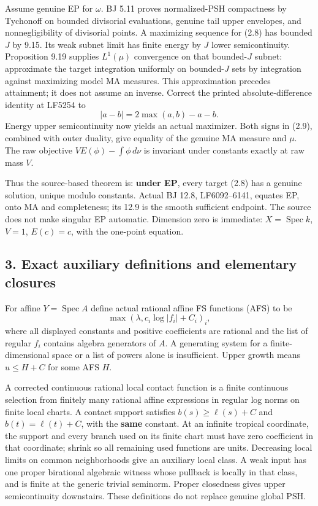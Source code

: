\documentclass[
  10pt,
]{article}
\begin{document}
Assume genuine EP for \(\omega\). BJ 5.11 proves normalized-PSH
compactness by Tychonoff on bounded divisorial evaluations, genuine tail
upper envelopes, and nonnegligibility of divisorial points. A maximizing
sequence for (2.8) has bounded \(J\) by 9.15. Its weak subnet limit has
finite energy by \(J\) lower semicontinuity. Proposition 9.19 supplies
\(L^1(\mu)\) convergence on that bounded-\(J\) subnet: approximate the
target integration uniformly on bounded-\(J\) sets by integration
against maximizing model MA measures. This approximation precedes
attainment; it does not assume an inverse. Correct the printed
absolute-difference identity at LF5254 to \[|a-b|=2\max(a,b)-a-b.\]
Energy upper semicontinuity now yields an actual maximizer. Both signs
in (2.9), combined with outer duality, give equality of the genuine MA
measure and \(\mu\). The raw objective \(VE(\phi)-\int\phi\,d\nu\) is
invariant under constants exactly at raw mass \(V\).

Thus the source-based theorem is: \textbf{under EP}, every target (2.8)
has a genuine solution, unique modulo constants. Actual BJ 12.8,
LF6092--6141, equates EP, onto MA and completeness; its 12.9 is the
smooth sufficient endpoint. The source does not make singular EP
automatic. Dimension zero is immediate: \(X=\operatorname{Spec}k\),
\(V=1\), \(E(c)=c\), with the one-point equation.

\subsection{3. Exact auxiliary definitions and elementary
closures}\label{exact-auxiliary-definitions-and-elementary-closures}

For affine \(Y=\operatorname{Spec}A\) define actual rational affine FS
functions (AFS) to be \[\max(\lambda,c_i\log|f_i|+C_i)_i,\] where all
displayed constants and positive coefficients are rational and the list
of regular \(f_i\) contains algebra generators of \(A\). A generating
system for a finite-dimensional space or a list of powers alone is
insufficient. Upper growth means \(u\le H+C\) for some AFS \(H\).

A corrected continuous rational local contact function is a finite
continuous selection from finitely many rational affine expressions in
regular log norms on finite local charts. A contact support satisfies
\(b(s)\ge\ell(s)+C\) and \(b(t)=\ell(t)+C\), with the \textbf{same}
constant. At an infinite tropical coordinate, the support and every
branch used on its finite chart must have zero coefficient in that
coordinate; shrink so all remaining used functions are units. Decreasing
local limits on common neighborhoods give an auxiliary local class. A
weak input has one proper birational algebraic witness whose pullback is
locally in that class, and is finite at the generic trivial seminorm.
Proper closedness gives upper semicontinuity downstairs. These
definitions do not replace genuine global PSH.
\end{document}
